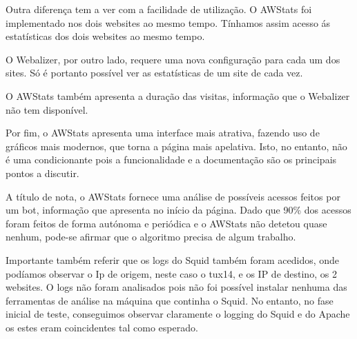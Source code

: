 Outra diferença tem a ver com a facilidade de utilização. O AWStats foi implementado nos dois websites ao mesmo tempo.
Tínhamos assim acesso ás estatísticas dos dois websites ao mesmo tempo.

O Webalizer, por outro lado, requere uma nova configuração para cada um dos sites.
Só é portanto possível ver as estatísticas de um site de cada vez.

O AWStats também apresenta a duração das visitas, informação que o Webalizer não tem disponível.

Por fim, o AWStats apresenta uma interface mais atrativa, fazendo uso de gráficos mais modernos, que torna a página mais apelativa.
Isto, no entanto, não é uma condicionante pois a funcionalidade e a documentação são os principais pontos a discutir.

A título de nota, o AWStats fornece uma análise de possíveis acessos feitos por um bot, informação que apresenta no início da página.
Dado que 90\% dos acessos foram feitos de forma autónoma e periódica e o AWStats não detetou quase nenhum, pode-se afirmar que o algoritmo precisa de algum trabalho.

Importante também referir que os logs do Squid também foram acedidos, onde podíamos observar o Ip de origem, neste caso o tux14, e os IP de destino, os 2 websites.
O logs não foram analisados pois não foi possível instalar nenhuma das ferramentas de análise na máquina que continha o Squid. No entanto,
no fase inicial de teste, conseguimos observar claramente o logging do Squid e do Apache os estes eram coincidentes tal como esperado.

